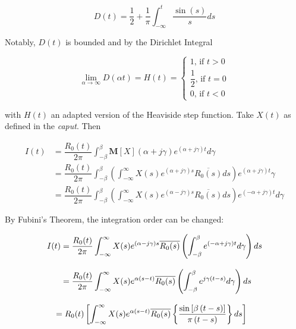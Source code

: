 \begin{equation} D(t) = \dfrac{1}{2} + \dfrac{1}{\pi}\int_{-\infty}^t \dfrac{\sin\left(s\right)}{s}ds \end{equation}

	Notably, $D(t)$ is bounded and by the Dirichlet Integral

\begin{equation} \lim_{\alpha\to\infty} D\left(\alpha t\right) = H(t) = \left\{\begin{array}{l} 1 \text{, if } t > 0 \\[3mm] \dfrac{1}{2} \text{, if } t = 0 \\[3mm] 0 \text{, if } t < 0 \end{array}\right. \end{equation}

	\noindent with $H(t)$ an adapted version of the Heaviside step function. Take $X(t)$ as defined in the \textit{caput}. Then

\begin{align}
	I(t) &= \dfrac{R_0(t)}{2\pi} \int_{-\beta}^{\beta} \mathbf{M}\left[X\right]\left(\alpha + j\gamma\right) e^{\left(\alpha + j\gamma\right)  t} d\gamma \nonumber\\[3mm]
	     &= \dfrac{R_0(t)}{2\pi} \int_{-\beta}^{\beta} \left(\int_{-\infty}^{\infty} X(s) e^{\left(\alpha + j\gamma\right) s} \overline{R_0(s)}ds\right) e^{\left(\alpha + j\gamma\right)  t} \gamma\nonumber\\[3mm]
	     &= \dfrac{R_0(t)}{2\pi} \int_{-\beta}^{\beta} \left(\int_{-\infty}^{\infty} X(s) e^{\left(\alpha - j\gamma\right) s} \overline{R_0(s)}ds\right) e^{\left(-\alpha + j\gamma\right)  t} d\gamma
\end{align}

	By Fubini's Theorem, the integration order can be changed:

\begin{align}
	I(t) &= \dfrac{R_0(t)}{2\pi} \int_{-\infty}^{\infty} X(s) e^{\left(\alpha - j\gamma\right) s} \overline{R_0(s)} \left(\int_{-\beta}^{\beta} e^{\left(-\alpha + j\gamma\right)  t}  d\gamma\right)ds \nonumber\\[3mm]
	     &= \dfrac{R_0(t)}{2\pi} \int_{-\infty}^{\infty} X(s) e^{\alpha\left(s - t\right)} \overline{R_0(s)} \left(\int_{-\beta}^{\beta} e^{j\gamma\left(t - s\right)} d\gamma\right)ds \nonumber\\[3mm]
	     &\hspace{-3mm}= R_0(t) \left[\int_{-\infty}^{\infty} X(s) e^{\alpha\left(s - t\right)} \overline{R_0(s)} \left\{\dfrac{\sin\left[\beta\left(t-s\right)\right]}{\pi\left(t-s\right)} \right\} ds \right]
\end{align}

